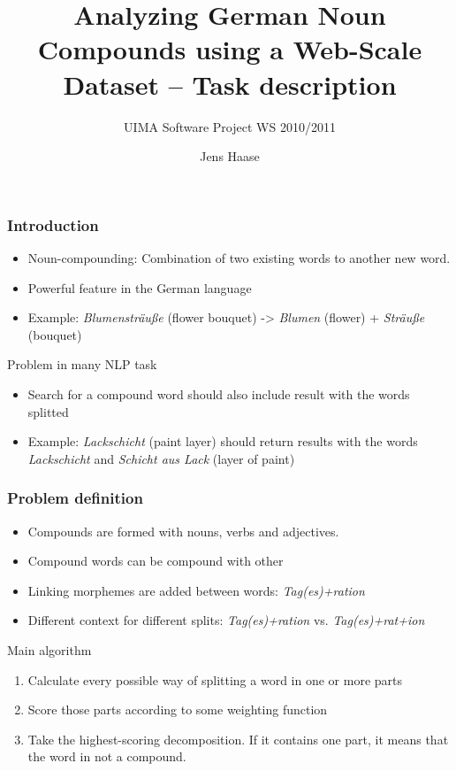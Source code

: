 \documentclass[accentcolor=tud9b, colorbacktitle, inverttitle]{tudbeamer}
\begin{document}
\author{Jens Haase} \title{Analyzing German Noun Compounds using a
  Web-Scale Dataset -- Task description} \subtitle{UIMA Software
  Project WS 2010/2011}

\begin{titleframe}
\end{titleframe}

\begin{frame}
  \frametitle{Introduction}
  \begin{itemize}
  \item Noun-compounding: Combination of two existing words to another
    new word.
  \item Powerful feature in the German language
  \item Example: \emph{Blumensträuße} (flower bouquet) ->
    \emph{Blumen} (flower) + \emph{Sträuße} (bouquet)
  \end{itemize}

  Problem in many NLP task
  \begin{itemize}
  \item Search for a compound word should also include result with the
    words splitted
  \item Example: \emph{Lackschicht} (paint layer) should return
    results with the words \emph{Lackschicht} and \emph{Schicht aus
      Lack} (layer of paint)
  \end{itemize}
\end{frame}

\begin{frame}
  \frametitle{Problem definition}
  \begin{itemize}
  \item Compounds are formed with nouns, verbs and adjectives.
  \item Compound words can be compound with other
  \item Linking morphemes are added between words:
    \emph{Tag(es)+ration}
  \item Different context for different splits: \emph{Tag(es)+ration}
    vs. \emph{Tag(es)+rat+ion}
  \end{itemize}


  Main algorithm \cite{alf2008}
  \begin{enumerate}
  \item Calculate every possible way of splitting a word in one or
    more parts
  \item Score those parts according to some weighting function
  \item Take the highest-scoring decomposition. If it contains one
    part, it means that the word in not a compound.
  \end{enumerate}
\end{frame}
\end{document}
